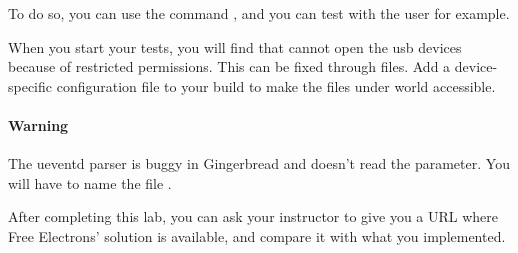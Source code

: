 To do so, you can use the command , and you can test with the
user  for example.

When you start your tests, you will find that  cannot
open the usb devices because of restricted permissions. This can be
fixed through  files. Add a device-specific
 configuration file to your build to make the files
under  world accessible.

\paragraph{Warning} The ueventd parser is buggy in Gingerbread and
doesn't read the  parameter. You will have
to name the file .

After completing this lab, you can ask your instructor to
give you a URL where Free Electrons' solution is available, and compare
it with what you implemented.
